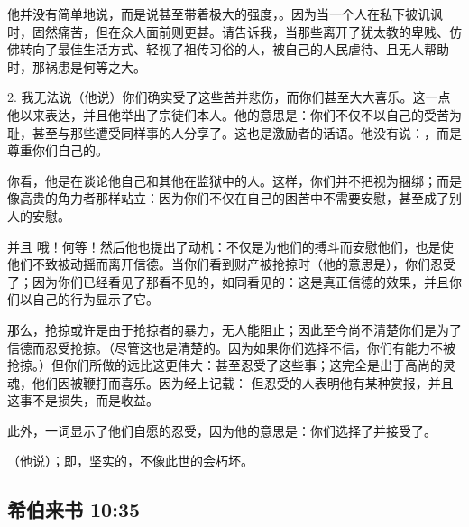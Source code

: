 他并没有简单地说，而是说甚至带着极大的强度，。因为当一个人在私下被讥讽时，固然痛苦，但在众人面前则更甚。请告诉我，当那些离开了犹太教的卑贱、仿佛转向了最佳生活方式、轻视了祖传习俗的人，被自己的人民虐待、且无人帮助时，那祸患是何等之大。\par

2. 我无法说（他说）你们确实受了这些苦并悲伤，而你们甚至大大喜乐。这一点他以来表达，并且他举出了宗徒们本人。他的意思是：你们不仅不以自己的受苦为耻，甚至与那些遭受同样事的人分享了。这也是激励者的话语。他没有说：，而是尊重你们自己的。\par

 你看，他是在谈论他自己和其他在监狱中的人。这样，你们并不把视为捆绑；而是像高贵的角力者那样站立：因为你们不仅在自己的困苦中不需要安慰，甚至成了别人的安慰。\par

并且 哦！何等！然后他也提出了动机：不仅是为他们的搏斗而安慰他们，也是使他们不致被动摇而离开信德。当你们看到财产被抢掠时（他的意思是），你们忍受了；因为你们已经看见了那看不见的，如同看见的：这是真正信德的效果，并且你们以自己的行为显示了它。\par

那么，抢掠或许是由于抢掠者的暴力，无人能阻止；因此至今尚不清楚你们是为了信德而忍受抢掠。（尽管这也是清楚的。因为如果你们选择不信，你们有能力不被抢掠。）但你们所做的远比这更伟大：甚至忍受了这些事；这完全是出于高尚的灵魂，他们因被鞭打而喜乐。因为经上记载： 但忍受的人表明他有某种赏报，并且这事不是损失，而是收益。\par

此外，一词显示了他们自愿的忍受，因为他的意思是：你们选择了并接受了。\par

（他说）；即，坚实的，不像此世的会朽坏。\par


\subsection{希伯来书 10:35}

